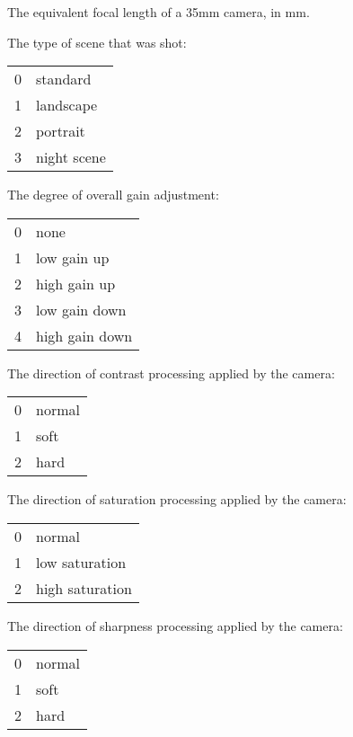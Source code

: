 The equivalent focal length of a 35mm camera, in mm.
\apiend

The type of scene that was shot:
\smallskip

\begin{tabular}{p{0.3in} p{4in}}
0 & standard \\
1 & landscape \\
2 & portrait \\
3 & night scene
\end{tabular}
\apiend

The degree of overall gain adjustment:
\smallskip

\begin{tabular}{p{0.3in} p{4in}}
0 & none \\
1 & low gain up \\
2 & high gain up \\
3 & low gain down \\
4 & high gain down
\end{tabular}
\apiend

The direction of contrast processing applied by the camera:
\smallskip

\begin{tabular}{p{0.3in} p{4in}}
0 & normal \\
1 & soft \\
2 & hard
\end{tabular}
\apiend

The direction of saturation processing applied by the camera:
\smallskip

\begin{tabular}{p{0.3in} p{4in}}
0 & normal \\
1 & low saturation \\
2 & high saturation
\end{tabular}
\apiend

The direction of sharpness processing applied by the camera:
\smallskip

\begin{tabular}{p{0.3in} p{4in}}
0 & normal \\
1 & soft \\
2 & hard
\end{tabular}
\apiend



